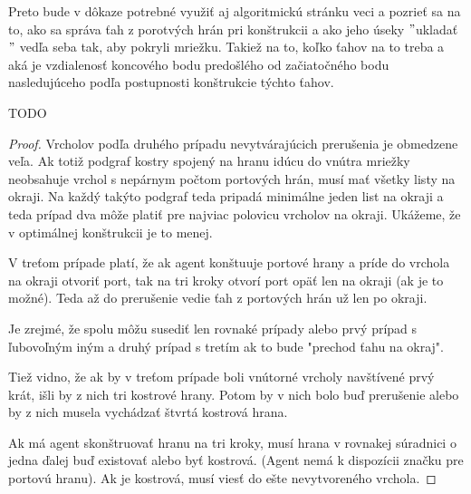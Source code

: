 Preto bude v dôkaze potrebné využiť aj algoritmickú stránku veci a pozrieť
sa na to, ako sa správa ťah z porotvých hrán pri konštrukcii a ako jeho
úseky $"$ukladať$"$ vedľa seba tak, aby pokryli mriežku. Takiež na to, koľko
ťahov na to treba a aká je vzdialenosť koncového bodu predošlého od
začiatočného bodu nasledujúceho podľa postupnosti konštrukcie týchto ťahov.


TODO
\iffalse
\begin{proof}
Vrcholov podľa druhého prípadu nevytvárajúcich prerušenia je obmedzene veľa.
Ak totiž podgraf kostry spojený na hranu idúcu do vnútra mriežky neobsahuje
vrchol s nepárnym počtom portových hrán, musí mať všetky listy na okraji.
Na každý takýto podgraf teda pripadá minimálne jeden list na okraji a teda
prípad dva môže platiť pre najviac polovicu vrcholov na okraji. Ukážeme, že
v optimálnej konštrukcii je to menej.

V treťom prípade platí, že ak agent konštuuje portové hrany a príde do
vrchola na okraji otvoriť port, tak na tri kroky otvorí port opäť len na
okraji (ak je to možné). Teda až do prerušenie vedie ťah z portových hrán už
len po okraji.

Je zrejmé, že spolu môžu susediť len rovnaké prípady alebo prvý prípad s
ľubovoľným iným a druhý prípad s tretím ak to bude "prechod ťahu na okraj".

Tiež vidno, že ak by v treťom prípade boli vnútorné vrcholy navštívené prvý
krát, išli by z nich tri kostrové hrany. Potom by v nich bolo buď prerušenie
alebo by z nich musela vychádzať štvrtá kostrová hrana.

Ak má agent skonštruovať hranu na tri kroky, musí hrana v rovnakej súradnici
o jedna ďalej buď existovať alebo byť kostrová. (Agent nemá k dispozícii
značku pre portovú hranu). Ak je kostrová, musí viesť do ešte nevytvoreného
vrchola.




\end{proof}
